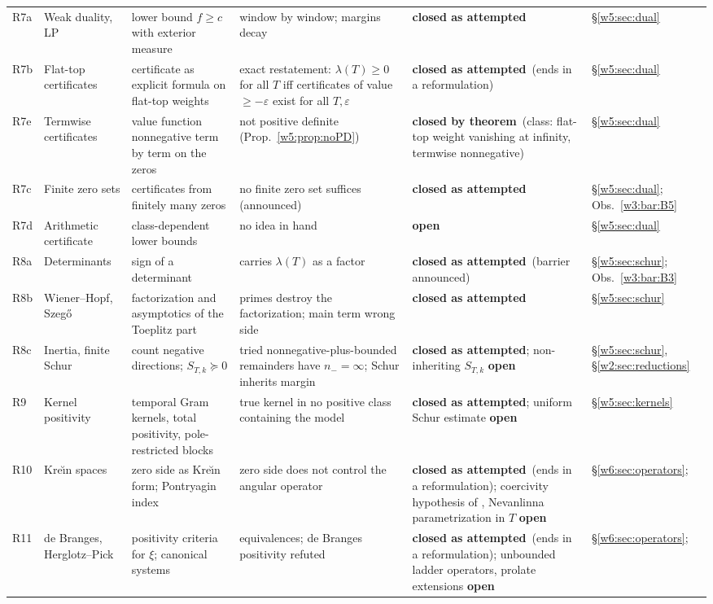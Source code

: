 \documentclass[11pt]{amsart}
\theoremstyle{definition}
\theoremstyle{remark}
\numberwithin{equation}{section}
\newcommand{\lam}{\lambda(T)}                          %
\newcommand{\rtag}[1]{\textbf{\small\textsf{#1}}}
\newcommand{\closedT}{\rtag{closed by theorem}}
\newcommand{\closedA}{\rtag{closed as attempted}}
\newcommand{\openR}{\rtag{open}}
\begin{document}
{\begin{longtable}{>{\raggedright}p{0.9cm}>{\raggedright}p{2.6cm}>{\raggedright}p{3.2cm}>{\raggedright}p{3.6cm}>{\raggedright}p{2.4cm}>{\raggedright\arraybackslash}p{1.9cm}}
R7a & Weak duality, LP & lower bound $f\ge c$ with exterior measure & window by window; margins decay & \closedA & \S\ref{w5:sec:dual}\\
R7b & Flat-top certificates & certificate as explicit formula on flat-top weights & exact restatement: $\lam\ge0$ for all $T$ iff certificates of value $\ge-\varepsilon$ exist for all $T,\varepsilon$ & \closedA\ (ends in a reformulation) & \S\ref{w5:sec:dual}\\
R7e & Termwise certificates & value function nonnegative term by term on the zeros & not positive definite (Prop.~\ref{w5:prop:noPD}) & \closedT\ (class: flat-top weight vanishing at infinity, termwise nonnegative) & \S\ref{w5:sec:dual}\\
R7c & Finite zero sets & certificates from finitely many zeros & no finite zero set suffices (announced) & \closedA & \S\ref{w5:sec:dual}; Obs.~\ref{w3:bar:B5}\\
R7d & Arithmetic certificate & class-dependent lower bounds & no idea in hand & \openR & \S\ref{w5:sec:dual}\\
R8a & Determinants & sign of a determinant & carries $\lam$ as a factor & \closedA\ (barrier announced) & \S\ref{w5:sec:schur}; Obs.~\ref{w3:bar:B3}\\
R8b & Wiener--Hopf, Szeg\H{o} & factorization and asymptotics of the Toeplitz part & primes destroy the factorization; main term wrong side & \closedA & \S\ref{w5:sec:schur}\\
R8c & Inertia, finite Schur & count negative directions; $S_{T,k}\succeq0$ & tried nonnegative-plus-bounded remainders have $n_-=\infty$; Schur inherits margin & \closedA; non-inheriting $S_{T,k}$ \openR & \S\ref{w5:sec:schur}, \S\ref{w2:sec:reductions}\\
R9 & Kernel positivity & temporal Gram kernels, total positivity, pole-restricted blocks & true kernel in no positive class containing the model & \closedA; uniform Schur estimate \openR & \S\ref{w5:sec:kernels}\\
R10 & Kre\u{\i}n spaces & zero side as Kre\u{\i}n form; Pontryagin index & zero side does not control the angular operator & \closedA\ (ends in a reformulation); coercivity hypothesis of \cite{P08}, Nevanlinna parametrization in $T$ \openR & \S\ref{w6:sec:operators}; \cite{P08,P11,P25}\\
R11 & de Branges, Herglotz--Pick & positivity criteria for $\xi$; canonical systems & equivalences; de Branges positivity refuted \cite{ConreyLi2000} & \closedA\ (ends in a reformulation); unbounded ladder operators, prolate extensions \openR & \S\ref{w6:sec:operators}; \cite{P20,P36}\\

\end{longtable}}
\end{document}
